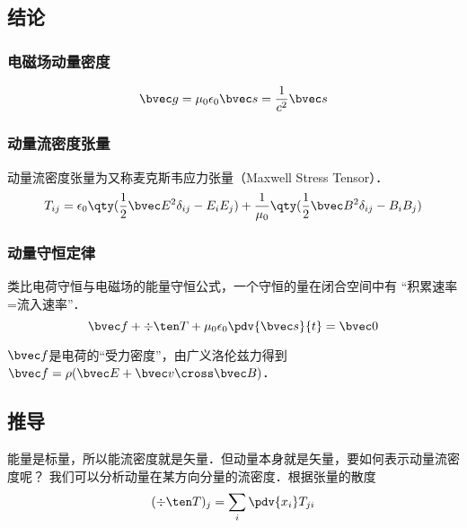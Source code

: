 
\subsection{结论}

\subsubsection{电磁场动量密度}
\begin{equation}
\bvec g = \mu_0 \epsilon_0 \bvec s = \frac{1}{c^2} \bvec s 
\end{equation}

\subsubsection{动量流密度张量}
动量流密度张量为又称麦克斯韦应力张量（Maxwell Stress Tensor）．
\begin{equation}\label{EBP_eq2}
T_{ij} = \epsilon_0 \qty(\frac12 \bvec E^2 \delta_{ij} - E_i E_j) + \frac{1}{\mu_0} \qty(\frac12 \bvec B^2 \delta_{ij} - B_i B_j)
\end{equation} 

\subsubsection{动量守恒定律}
类比电荷守恒与电磁场的能量守恒公式，一个守恒的量在闭合空间中有 “积累速率=流入速率”．
\begin{equation}\label{EBP_eq1}
\bvec f + \div \ten T + \mu_0 \epsilon_0 \pdv{\bvec s}{t} = \bvec 0
\end{equation} 

$\bvec f$是电荷的“受力密度”，由广义洛伦兹力得到$\bvec f = \rho (\bvec E + \bvec v \cross \bvec B)$．

\subsection{推导}	
能量是标量，所以能流密度就是矢量．但动量本身就是矢量，要如何表示动量流密度呢？ 
我们可以分析动量在某方向分量的流密度．根据张量的散度%
\begin{equation}
(\div \ten T)_j = \sum_i \pdv{x_i} T_{ji}
\end{equation}


